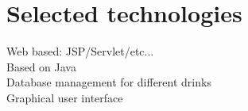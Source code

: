 \section{Selected technologies}
\label{sec:techno}

Web based: JSP/Servlet/etc...\\
Based on Java\\
Database management for different drinks\\
Graphical user interface\\

